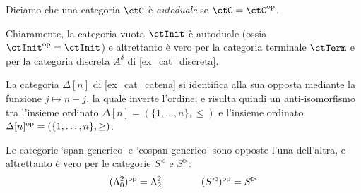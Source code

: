 \begin{definition}\label{def_subcat}
\end{definition}
\begin{definition}\label{def_cat_prodotto}
\end{definition}
\begin{definition}\label{def_cat_somma}
\end{definition}
\begin{definition}\label{def_cat_opp}
\end{definition}
\begin{remark}
	Diciamo che una categoria \(\ctC\) è \emph{autoduale} se \(\ctC=\ctC^\op\).

	Chiaramente, la categoria vuota \(\ctInit\) è autoduale (ossia \(\ctInit^\op=\ctInit\)) e altrettanto è vero per la categoria terminale \(\ctTerm\) e per la categoria discreta \(A^\delta\) di \ref{ex_cat_discreta}.

	La categoria \(\Delta[n]\) di \ref{ex_cat_catena} si identifica alla sua opposta mediante la funzione \(j\mapsto n-j\), la quale inverte l'ordine, e risulta quindi un anti-isomorfismo tra l'insieme ordinato \(\Delta[n]=(\{1,\dots,n\},\le)\) e l'insieme ordinato \(\Delta[n]^{\text{op}} = (\{1,\dots,n\},\ge)\).

	Le categorie `span generico' e `cospan generico' sono opposte l'una dell'altra, e altrettanto è vero per le categorie \(S^\lhd\) e \(S^\rhd\):
	\[(\Lambda^2_0)^{\text{op}} = \Lambda^2_2\qquad\qquad (S^\lhd)^{\text{op}} = S^\rhd\]
\end{remark}
\begin{definition}\label{def_cat_slice}
\end{definition}
\begin{example}\label{def_spazi_pun_coslice}
\end{example}
\begin{definition}\label{def_scheletro}
\end{definition}
\begin{definition}\label{def_cat_frecce}
\end{definition}
\begin{definition}\label{def_span_e_cospan}
\end{definition}
